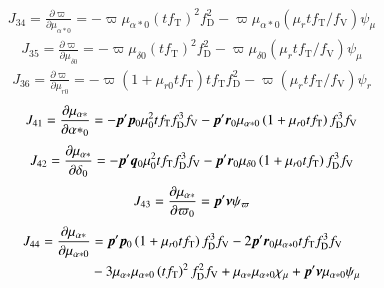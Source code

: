 \documentclass{aa}
\def\vec#1{\ensuremath{\mathchoice{\mbox{\boldmath$\displaystyle#1$}}
{\mbox{\boldmath$\textstyle#1$}}
{\mbox{\boldmath$\scriptstyle#1$}}
{\mbox{\boldmath$\scriptscriptstyle#1$}}}}
\begin{document}
\begin{equation*}
 \begin{aligned}
    J_{34}=\frac{\partial\varpi}{\partial\mu_{\alpha*0}}=
    -\varpi\mu_{\alpha*0}\left(tf_\mathrm{T}\right)^2f_\mathrm{D}^2
    -\varpi\mu_{\alpha*0}\left(\mu_rtf_\mathrm{T}/f_\mathrm{V}\right)\psi_\mu
 \end{aligned}
\end{equation*}
\begin{equation*}
 \begin{aligned}
    J_{35}=\frac{\partial\varpi}{\partial\mu_{\delta0}}=
    -\varpi\mu_{\delta0}\left(tf_\mathrm{T}\right)^2f_\mathrm{D}^2
    -\varpi\mu_{\delta0}\left(\mu_rtf_\mathrm{T}/f_\mathrm{V}\right)\psi_\mu
 \end{aligned}
\end{equation*}
\begin{equation*}
 \begin{aligned}
    J_{36}=\frac{\partial\varpi}{\partial\mu_{r0}}=
    -\varpi\left(1+\mu_{r0}tf_\mathrm{T}\right)tf_\mathrm{T}f_\mathrm{D}^2
    -\varpi\left(\mu_rtf_\mathrm{T}/f_\mathrm{V}\right)\psi_r
 \end{aligned}
\end{equation*}
\begin{equation*}
 \begin{aligned}
    J_{41}=\frac{\partial\mu_{\alpha*}}{\partial{\alpha*}_0}=
    -\vec{p}'\vec{p}_0\mu_0^2tf_\mathrm{T}f_\mathrm{D}^3f_\mathrm{V}
    -\vec{p}'\vec{r}_0\mu_{\alpha*0}\left(1+\mu_{r0}tf_\mathrm{T}\right)f_\mathrm{D}^3f_\mathrm{V}
 \end{aligned}
\end{equation*}
\begin{equation*}
 \begin{aligned}
    J_{42}=\frac{\partial\mu_{\alpha*}}{\partial\delta_0}=
    -\vec{p}'\vec{q}_0\mu_0^2tf_\mathrm{T}f_\mathrm{D}^3f_\mathrm{V}
    -\vec{p}'\vec{r}_0\mu_{\delta0}\left(1+\mu_{r0}tf_\mathrm{T}\right)f_\mathrm{D}^3f_\mathrm{V}
 \end{aligned}
\end{equation*}
\begin{equation*}
 \begin{aligned}
    J_{43}=\frac{\partial\mu_{\alpha*}}{\partial\varpi_0}=
    \vec{p}'\vec{\nu}\psi_\varpi
 \end{aligned}
\end{equation*}
\begin{equation*}
 \begin{aligned}
    J_{44}=\frac{\partial\mu_{\alpha*}}{\partial\mu_{\alpha*0}} &=
    \vec{p}'\vec{p}_0\left(1+\mu_{r0}tf_\mathrm{T}\right)f_\mathrm{D}^3f_\mathrm{V}
    -2\vec{p}'\vec{r}_0\mu_{\alpha*0}tf_\mathrm{T}f_\mathrm{D}^3f_\mathrm{V}\\
    &-3\mu_{\alpha*}\mu_{\alpha*0}\left(tf_\mathrm{T}\right)^2f_\mathrm{D}^2f_\mathrm{V}
    +\mu_{\alpha*}\mu_{\alpha*0}\chi_\mu
    +\vec{p}'\vec{\nu}\mu_{\alpha*0}\psi_\mu
 \end{aligned}
\end{equation*}
\end{document}
